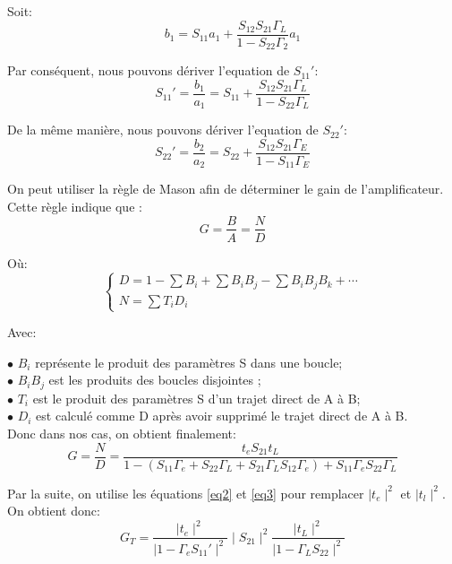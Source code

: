 \documentclass[french]{article}
\begin{document}
Soit: 
\begin{equation}
	b_{1}=S_{11}a_{1}+\frac{S_{12}S_{21}\Gamma_{L}}{1-S_{22}\Gamma_{2}}a_{1}
\end{equation}

Par conséquent, nous pouvons dériver l'equation de ${S_{11}}'$:
\begin{equation}
	{S_{11}}'=\frac{b_{1}}{a_{1}}
	=S_{11}+\frac{S_{12}S_{21}\Gamma_{L}}{1-S_{22}\Gamma_{L}}
\end{equation}

De la même manière, nous pouvons dériver l'equation de ${S_{22}}'$:
\begin{equation}
	{S_{22}}'=\frac{b_{2}}{a_{2}}
	=S_{22}+\frac{S_{12}S_{21}\Gamma_{E}}{1-S_{11}\Gamma_{E}}
\end{equation}

On peut utiliser la règle de Mason afin de déterminer le gain de l’amplificateur. Cette règle indique que :
\begin{equation}
	G=\frac{B}{A}=\frac{N}{D}
\end{equation}

Où:
\begin{equation}
	\left\{\begin{matrix}
		D=1-\sum{B_{i}}+\sum{B_{i}B_{j}}-\sum{B_{i}B_{j}B_{k}}+{\cdots}\\ 
		N=\sum{T_{i}D_{i}}
	\end{matrix}\right.
\end{equation}

Avec:

$\bullet$ $B_{i}$ représente le produit des paramètres S dans une boucle;\\
$\bullet$ $B_{i}B_{j}$ est les produits des boucles disjointes ;\\
$\bullet$ $T_{i}$ est le produit des paramètres S d’un trajet direct de A à B;\\
$\bullet$ $D_{i}$ est calculé comme D après avoir supprimé le trajet direct de A à B.\\

Donc dans nos cas, on obtient finalement:
\begin{equation}
	G=\frac{N}{D}=\frac{t_{e}S_{21}t_{L}}{1-\left (S_{11}\Gamma_{e}+S_{22}\Gamma_{L}+S_{21}\Gamma_{L}S_{12}\Gamma_{e}\right)+S_{11}\Gamma_{e}S_{22}\Gamma_{L}}
\end{equation}

Par la suite, on utilise les équations \ref{eq2} et \ref{eq3} pour remplacer $\mid t_{e}\mid ^{2}$ et $\mid t_{l}\mid ^{2}$. On obtient donc:
\begin{equation}
	G_{T}=\frac{\mid t_{e}\mid ^{2}}{\mid 1-\Gamma_{e}{S_{11}}'\mid ^{2}}\mid S_{21}\mid ^{2}\frac{\mid t_{L}\mid ^{2}}{\mid 1-\Gamma_{L}S_{22}\mid^{2}}
\end{equation}
\end{document}
